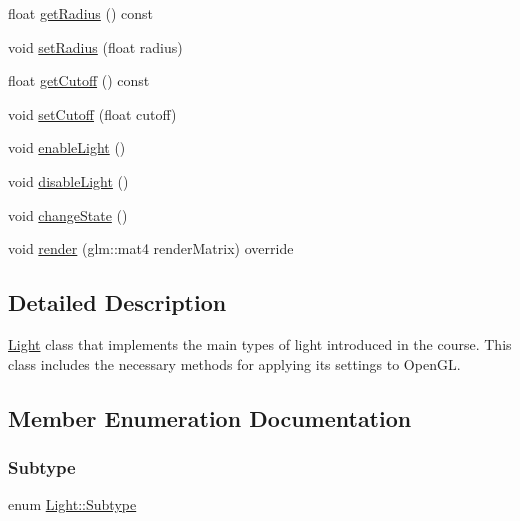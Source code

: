 \begin{DoxyCompactItemize}
float \hyperlink{classLight_a6bb146ceb8e047d6fa7660e0aa5dca9d}{get\+Radius} () const
\item 
void \hyperlink{classLight_a23e09d82da020bc04cd9cecf8ca1461b}{set\+Radius} (float radius)
\item 
float \hyperlink{classLight_a73794614318f137338f87bd773739f78}{get\+Cutoff} () const
\item 
void \hyperlink{classLight_adb7e95904a97034f319b60236e578ecc}{set\+Cutoff} (float cutoff)
\item 
void \hyperlink{classLight_a4a605e1a566089fb330938b0e7820185}{enable\+Light} ()
\item 
void \hyperlink{classLight_a3990013078306656215c200537868835}{disable\+Light} ()
\item 
void \hyperlink{classLight_a5d257d1ad65b8c8ab986dcbba2e9c5ff}{change\+State} ()
\item 
void \hyperlink{classLight_a069c6888b42eca238328d79b03c3a411}{render} (glm\+::mat4 render\+Matrix) override
\end{DoxyCompactItemize}


\subsection{Detailed Description}
\hyperlink{classLight}{Light} class that implements the main types of light introduced in the course. This class includes the necessary methods for applying its settings to Open\+GL. 

\subsection{Member Enumeration Documentation}
\mbox{\label{classLight_a7b5feeb01dd53961e0e523f3d2f5fa7f}} 
\subsubsection{\texorpdfstring{Subtype}{Subtype}}
{\footnotesize\ttfamily enum \hyperlink{classLight_a7b5feeb01dd53961e0e523f3d2f5fa7f}{Light\+::\+Subtype}}

